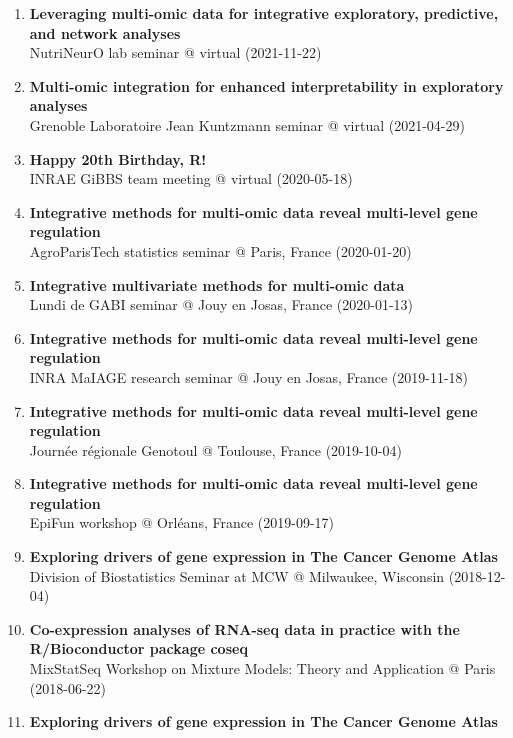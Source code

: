 \documentclass[11pt, a4paper]{awesome-cv}
\providecommand{\tightlist}{%
	\setlength{\itemsep}{0pt}\setlength{\parskip}{0pt}}
\begin{document}
\begin{enumerate}
\def\labelenumi{\arabic{enumi}.}
\tightlist
\item
  \textbf{Leveraging multi-omic data for integrative exploratory,
  predictive, and network analyses}\\
  NutriNeurO lab seminar @ virtual (2021-11-22)
\item
  \textbf{Multi-omic integration for enhanced interpretability in
  exploratory analyses}\\
  Grenoble Laboratoire Jean Kuntzmann seminar @ virtual (2021-04-29)
\item
  \textbf{Happy 20th Birthday, R!}\\
  INRAE GiBBS team meeting @ virtual (2020-05-18)
\item
  \textbf{Integrative methods for multi-omic data reveal multi-level
  gene regulation}\\
  AgroParisTech statistics seminar @ Paris, France (2020-01-20)
\item
  \textbf{Integrative multivariate methods for multi-omic data}\\
  Lundi de GABI seminar @ Jouy en Josas, France (2020-01-13)
\item
  \textbf{Integrative methods for multi-omic data reveal multi-level
  gene regulation}\\
  INRA MaIAGE research seminar @ Jouy en Josas, France (2019-11-18)
\item
  \textbf{Integrative methods for multi-omic data reveal multi-level
  gene regulation}\\
  Journée régionale Genotoul @ Toulouse, France (2019-10-04)
\item
  \textbf{Integrative methods for multi-omic data reveal multi-level
  gene regulation}\\
  EpiFun workshop @ Orléans, France (2019-09-17)
\item
  \textbf{Exploring drivers of gene expression in The Cancer Genome
  Atlas}\\
  Division of Biostatistics Seminar at MCW @ Milwaukee, Wisconsin
  (2018-12-04)
\item
  \textbf{Co-expression analyses of RNA-seq data in practice with the
  R/Bioconductor package coseq}\\
  MixStatSeq Workshop on Mixture Models: Theory and Application @ Paris
  (2018-06-22)
\item
  \textbf{Exploring drivers of gene expression in The Cancer Genome
  Atlas}\\

\end{enumerate}
\end{document}
